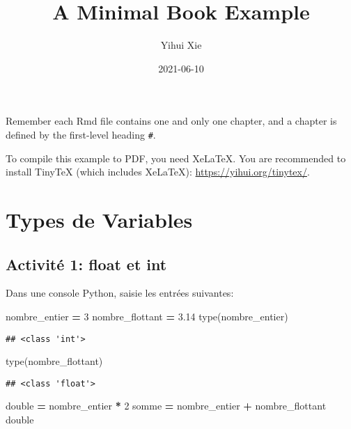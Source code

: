 \documentclass[
]{book}
\title{A Minimal Book Example}
\author{Yihui Xie}
\date{2021-06-10}
\newenvironment{Shaded}{\begin{snugshade}}{\end{snugshade}}
\newcommand{\BuiltInTok}[1]{#1}
\newcommand{\DecValTok}[1]{\textcolor[rgb]{0.00,0.00,0.81}{#1}}
\newcommand{\FloatTok}[1]{\textcolor[rgb]{0.00,0.00,0.81}{#1}}
\newcommand{\NormalTok}[1]{#1}
\newcommand{\OperatorTok}[1]{\textcolor[rgb]{0.81,0.36,0.00}{\textbf{#1}}}
\begin{document}
\maketitle

{
\setcounter{tocdepth}{1}
\tableofcontents
}
Remember each Rmd file contains one and only one chapter, and a chapter is defined by the first-level heading \texttt{\#}.

To compile this example to PDF, you need XeLaTeX. You are recommended to install TinyTeX (which includes XeLaTeX): \url{https://yihui.org/tinytex/}.

\hypertarget{types-de-variables}{%
\chapter{Types de Variables}\label{types-de-variables}}

\hypertarget{activituxe9-1-float-et-int}{%
\section{Activité 1: float et int}\label{activituxe9-1-float-et-int}}

Dans une console Python, saisie les entrées suivantes:

\begin{Shaded}
\begin{Highlighting}[]
\NormalTok{nombre\_entier }\OperatorTok{=} \DecValTok{3} 
\NormalTok{nombre\_flottant }\OperatorTok{=} \FloatTok{3.14}
\BuiltInTok{type}\NormalTok{(nombre\_entier)}
\end{Highlighting}
\end{Shaded}

\begin{verbatim}
## <class 'int'>
\end{verbatim}

\begin{Shaded}
\begin{Highlighting}[]
\BuiltInTok{type}\NormalTok{(nombre\_flottant)}
\end{Highlighting}
\end{Shaded}

\begin{verbatim}
## <class 'float'>
\end{verbatim}

\begin{Shaded}
\begin{Highlighting}[]
\NormalTok{double }\OperatorTok{=}\NormalTok{ nombre\_entier }\OperatorTok{*} \DecValTok{2}
\NormalTok{somme }\OperatorTok{=}\NormalTok{ nombre\_entier }\OperatorTok{+}\NormalTok{ nombre\_flottant}
\NormalTok{double}
\end{Highlighting}
\end{Shaded}
\end{document}
